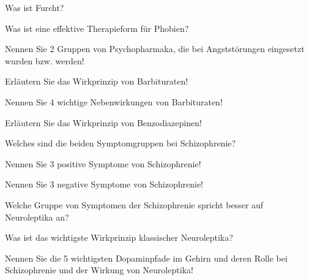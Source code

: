 \documentclass[10pt, a4paper]{exam}
\begin{document}
\begin{questions}
  \question Was ist Furcht?
  \begin{solution}
  \end{solution}
  \question Was ist eine effektive Therapieform für Phobien?
  \begin{solution}
  \end{solution}
  \question Nennen Sie 2 Gruppen von Psychopharmaka, die bei Angststörungen eingesetzt wurden bzw. werden!
  \begin{solution}
  \end{solution}
  \question Erläutern Sie das Wirkprinzip von Barbituraten!
  \begin{solution}
  \end{solution}
  \question Nennen Sie 4 wichtige Nebenwirkungen von Barbituraten!
  \begin{solution}
  \end{solution}
  \question Erläutern Sie das Wirkprinzip von Benzodiazepinen!
  \begin{solution}
  \end{solution}
  \question Welches sind die beiden Symptomgruppen bei Schizophrenie?
  \begin{solution}
  \end{solution}
  \question Nennen Sie 3 positive Symptome von Schizophrenie!
  \begin{solution}
  \end{solution}
  \question Nennen Sie 3 negative Symptome von Schizophrenie!
  \begin{solution}
  \end{solution}
  \question Welche Gruppe von Symptomen der Schizophrenie spricht besser auf Neuroleptika an?
  \begin{solution}
  \end{solution}
  \question Was ist das wichtigste Wirkprinzip klassischer Neuroleptika?
  \begin{solution}
  \end{solution}
  \question Nennen Sie die 5 wichtigsten Dopaminpfade im Gehirn und deren Rolle bei Schizophrenie und der Wirkung von Neuroleptika!
  \begin{solution}
  \end{solution}
\end{questions}
\end{document}
